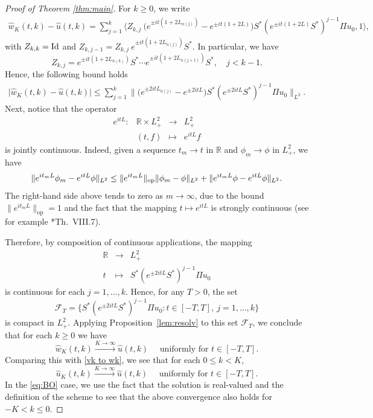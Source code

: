 \documentclass [11pt] {article}
\newcommand{\<}{\langle}
\renewcommand{\>}{\rangle}
\newcommand\R{\mathbb{R}}
\newcommand{\mc}[1]{\mathcal{#1}}
\newcommand{\op}{\textup{op}}
\begin{document}
\begin{proof}[Proof of Theorem \ref{thm:main}]
For $k \ge 0$, we write
\begin{align*}
\widehat{w}_{K}(t,k) - \widehat{u}(t,k) = \sum_{j=1}^{k} \Big\langle Z_{k,j} \ \big( e^{\pm it(1+2L_{n(j)})} - e^{\pm it(1+2L)}\big) S^{*} (e^{\pm it(1+2L)}S^*)^{j-1}\Pi u_0 , 1 \Big\rangle,
\end{align*}
with $Z_{k,k} = \rm{Id}$ and $Z_{k,j-1} = Z_{k,j} \ e^{\pm it(1+2L_{n(j)})}S^{*}$. In particular, we have 
\[Z_{k,j} = e^{\pm it(1+2L_{n(k)})}S^{*}\cdots e^{\pm it(1+2L_{n(j+1)})}S^{*}, \quad j<k-1.
\]
Hence, the following bound holds
\begin{align*}
\big| \widehat{w}_{K}(t,k) - \widehat{u}(t,k) \big| \le \sum_{j=1}^{k} \big\| \big( e^{\pm 2itL_{n(j)}} - e^{\pm 2itL}\big) S^{*} (e^{\pm 2itL}S^*)^{j-1}\Pi u_0 \big\|_{L^2} .
\end{align*}
%
Next, notice that the operator 
\[ \begin{array}{rccl}
e^{itL} \colon &\mathbb{R} \times L^2_+ & \longrightarrow & L^2_+ \\
&(t, f) & \longmapsto & e^{itL} f
\end{array}\]
is jointly continuous.  Indeed, given a sequence $t_m\to t$ in $\R$ and $\phi_m\to \phi$ in $L^2_+$, we have
\begin{equation*}
\| e^{it_mL} \phi_m - e^{itL}\phi \|_{L^2}
\leq \| e^{it_m L} \|_{\op} \| \phi_m - \phi \|_{L^2} + \| e^{it_m L} \phi - e^{itL}\phi \|_{L^2} .
\end{equation*}
The right-hand side above tends to zero as $m \to \infty$, due to the bound $\|e^{it_m L}\|_{\mathrm{op}} = 1$ and the fact that the mapping $t \mapsto e^{itL}$ is strongly continuous (see for example \cite{ReedSimonvol1}*{Th.~VIII.7}).

Therefore, by composition of continuous applications, the mapping
\[ \begin{array}{ccl}
\mathbb{R} &\longrightarrow &L^2_{+}\\
t &\longmapsto& S^{*} (e^{\pm 2itL}S^*)^{j-1}\Pi u_0
\end{array}\]
is continuous for each $j = 1,\dots,k$. Hence,
for any $T>0$, the set
\begin{equation*}
\mc{F}_T = \big\{ S^{*} (e^{\pm 2itL}S^*)^{j-1}\Pi u_0 : t\in [-T,T],\ j=1,\dots, k \big\} 
\end{equation*}
is compact in $L^2_+$.  Applying Proposition~\ref{lem:resolv} to this set $\mc{F}_T$,
we conclude that for each $k\geq 0$ we have
\begin{equation*}
\widehat{w}_{K}(t,k) \xrightarrow{K\to\infty}
\widehat{u}(t,k) \quad\text{ uniformly for }t\in [-T,T] .
\end{equation*}
%
Comparing this with \eqref{vk to wk}, we see that for each $ 0 \le k < K$,
\begin{equation*}
\widehat{u}_{K}(t,k) \xrightarrow{K\to\infty}
\widehat{u}(t,k) \quad \text{ uniformly for }t\in [-T,T] .
\end{equation*}
In the \eqref{eq:BO} case, we use
the fact that the solution is real-valued and the definition of the scheme to see that the above convergence also holds for $-K < k\le 0$.


\end{proof}
\end{document}
